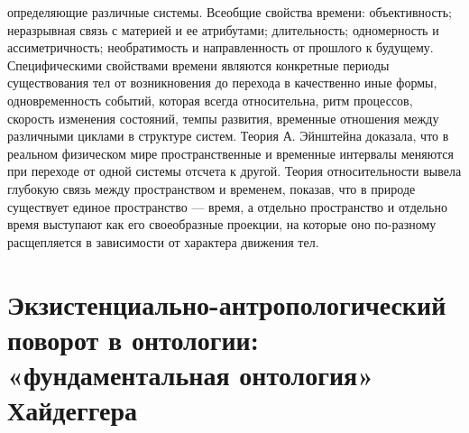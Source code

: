 \documentclass[12pt]{article}
\begin{document}
определяющие различные системы.
Всеобщие свойства времени: объективность; неразрывная связь с материей и ее атрибутами; длительность;
одномерность и ассиметричность; необратимость и направленность от прошлого к будущему.
Специфическими свойствами времени являются конкретные периоды существования тел от возникновения до
перехода в качественно иные формы, одновременность событий, которая всегда относительна, ритм процессов,
скорость изменения состояний, темпы развития, временные отношения между различными циклами в структуре
систем.
Теория А. Эйнштейна доказала, что в реальном физическом мире пространственные и временные интервалы
меняются при переходе от одной системы отсчета к другой.
Теория относительности вывела глубокую связь между пространством и временем, показав, что в природе
существует единое  пространство —  время,  а  отдельно  пространство и отдельно  время выступают  как  его
своеобразные проекции, на которые оно по-разному расщепляется в зависимости от характера движения тел. 


\newpage
\section{Экзистенциально-антропологический поворот в онтологии: «фундаментальная онтология» Хайдеггера}
\end{document}
